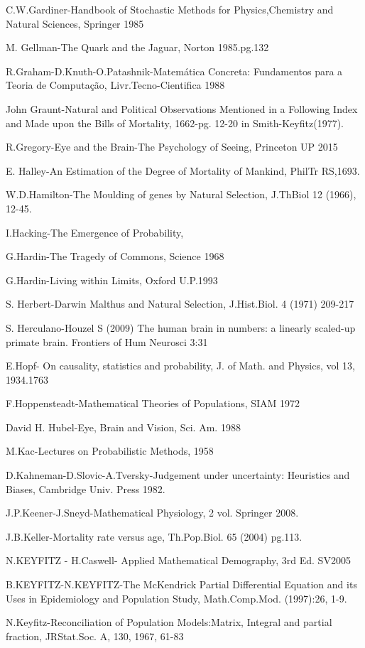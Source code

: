 C.W.Gardiner-Handbook of Stochastic Methods for Physics,Chemistry and Natural Sciences, Springer 1985

M. Gellman-The Quark and the Jaguar, Norton 1985.pg.132

R.Graham-D.Knuth-O.Patashnik-Matemática Concreta: Fundamentos para a Teoria de Computação, Livr.Tecno-Cientifica 1988

John Graunt-Natural and Political Observations Mentioned in a Following Index and Made upon the Bills of Mortality, 1662-pg. 12-20 in Smith-Keyfitz(1977).

R.Gregory-Eye and the Brain-The Psychology of Seeing, Princeton UP 2015

E. Halley-An Estimation of the Degree of Mortality of Mankind, PhilTr RS,1693.

W.D.Hamilton-The Moulding of genes by Natural Selection, J.ThBiol 12 (1966), 12-45.

I.Hacking-The Emergence of Probability,

G.Hardin-The Tragedy of Commons, Science 1968

G.Hardin-Living within Limits, Oxford U.P.1993

S. Herbert-Darwin Malthus and Natural Selection, J.Hist.Biol. 4 (1971) 209-217

S. Herculano-Houzel S (2009) The human brain in numbers: a linearly scaled-up primate brain. Frontiers of Hum Neurosci 3:31

E.Hopf- On causality, statistics and probability, J. of Math. and Physics, vol 13, 1934.1763

F.Hoppensteadt-Mathematical Theories of Populations, SIAM 1972

David H. Hubel-Eye, Brain and Vision, Sci. Am. 1988

M.Kac-Lectures on Probabilistic Methods, 1958

D.Kahneman-D.Slovic-A.Tversky-Judgement under uncertainty: Heuristics and Biases, Cambridge Univ. Press 1982.

J.P.Keener-J.Sneyd-Mathematical Physiology, 2 vol. Springer 2008.

J.B.Keller-Mortality rate versus age, Th.Pop.Biol. 65 (2004) pg.113.

N.KEYFITZ - H.Caswell- Applied Mathematical Demography, 3rd Ed. SV2005

B.KEYFITZ-N.KEYFITZ-The McKendrick Partial Differential Equation and its Uses in Epidemiology and Population Study, Math.Comp.Mod. (1997):26, 1-9.

N.Keyfitz-Reconciliation of Population Models:Matrix, Integral and partial fraction, JRStat.Soc. A, 130, 1967, 61-83

